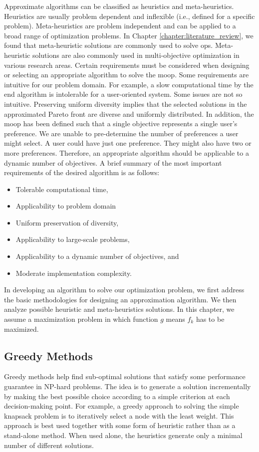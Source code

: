 Approximate algorithms can be classified as heuristics and meta-heuristics. Heuristics are usually problem dependent and inflexible (i.e., defined for a specific problem). Meta-heuristics are problem independent and can be applied to a broad range of optimization problems. In Chapter \ref{chapter:literature_review}, we found that meta-heuristic solutions are commonly used to solve \glspl{op}. Meta-heuristic solutions are also commonly used in multi-objective optimization in various research areas. Certain requirements must be considered when designing or selecting an appropriate algorithm to solve the \gls{moop}. Some requirements are intuitive for our problem domain. For example, a slow computational time by the end algorithm is intolerable for a user-oriented system. Some issues are not so intuitive. Preserving uniform diversity implies that the selected solutions in the approximated Pareto front are diverse and uniformly distributed. In addition, the \gls{moop} has been defined such that a single objective represents a single user’s preference. We are unable to pre-determine the number of preferences a user might select. A user could have just one preference. They might also have two or more preferences. Therefore, an appropriate algorithm should be applicable to a dynamic number of objectives. A brief summary of the most important requirements of the desired algorithm is as follows:
\begin{itemize}
    \item Tolerable computational time,
    \item Applicability to problem domain
    \item Uniform preservation of diversity, 
    \item Applicability to large-scale problems,
    \item Applicability to a dynamic number of objectives, and
    \item Moderate implementation complexity.
\end{itemize}



In developing an algorithm to solve our optimization problem, we first address the basic methodologies for designing an approximation algorithm. We then analyze possible heuristic and meta-heuristics solutions. In this chapter, we assume a maximization problem in which function $g$ means $f_k$ has to be maximized.

\subsection{Greedy Methods}
Greedy methods help find sub-optimal solutions that satisfy some performance guarantee in NP-hard problems. The idea is to generate a solution incrementally by making the best possible choice according to a simple criterion at each decision-making point. For example, a greedy approach to solving the simple knapsack problem is to iteratively select a node with the least weight. This approach is best used together with some form of heuristic rather than as a stand-alone method. When used alone, the heuristics generate only a minimal number of different solutions.


